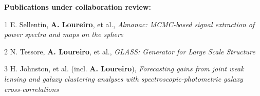 \begin{cvitems}
\vspace{0.4cm}
\hspace{-0.4cm}\textbf{Publications under collaboration review:}

\item[1] \footnotesize{E. Sellentin, {\textbf{A. Loureiro}}, et al., \textit{Almanac: MCMC-based signal extraction of power spectra and maps on the sphere}}
\item[2] \footnotesize{N. Tessore, {\textbf{A. Loureiro}}, et al., \textit{GLASS: Generator for Large Scale Structure}}
\item[3] \footnotesize{H. Johnston, et al. (incl. {\textbf{A. Loureiro}}), \textit{Forecasting gains from joint weak lensing and galaxy clustering analyses with spectroscopic-photometric galaxy cross-correlations}}

\vspace{0.4cm}
\end{cvitems}







